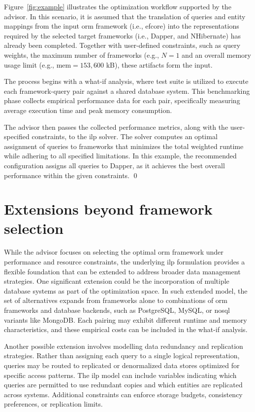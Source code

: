\begin{example}    
\small
Figure~\ref{fig:example} illustrates the optimization workflow supported by the advisor. In this scenario, it is assumed that the translation of queries and entity mappings from the input \acrshort{orm} framework (i.e., \acrshort{efcore}) into the representations required by the selected target frameworks (i.e., Dapper, and NHibernate) has already been completed. Together with user-defined constraints, such as query weights, the maximum number of frameworks (e.g., $N = 1$ and an overall memory usage limit (e.g., $\text{mem} = 153,600$ kB), these artifacts form the input.

The process begins with a what-if analysis, where test suite is utilized to execute each framework-query pair against a shared database system. This benchmarking phase collects empirical performance data for each pair, specifically measuring average execution time and peak memory consumption.

The advisor then passes the collected performance metrics, along with the user-specified constraints, to the \acrshort{ilp} solver. The solver computes an optimal assignment of queries to frameworks that minimizes the total weighted runtime while adhering to all specified limitations. In this example, the recommended configuration assigns all queries to Dapper, as it achieves the best overall performance within the given constraints.
\qed
\end{example}

\section{Extensions beyond framework selection}
\label{sec:advisor_extensions}

While the advisor focuses on selecting the optimal \acrshort{orm} framework under performance and resource constraints, the underlying \acrshort{ilp} formulation provides a flexible foundation that can be extended to address broader data management strategies. One significant extension could be the incorporation of multiple database systems as part of the optimization space. In such extended model, the set of alternatives expands from frameworks alone to combinations of \acrshort{orm} frameworks and database backends, such as PostgreSQL, MySQL, or \acrshort{nosql} variants like MongoDB. Each pairing may exhibit different runtime and memory characteristics, and these empirical costs can be included in the what-if analysis.

Another possible extension involves modelling data redundancy and replication strategies. Rather than assigning each query to a single logical representation, queries may be routed to replicated or denormalized data stores optimized for specific access patterns. The \acrshort{ilp} model can include variables indicating which queries are permitted to use redundant copies and which entities are replicated across systems. Additional constraints can enforce storage budgets, consistency preferences, or replication limits.
